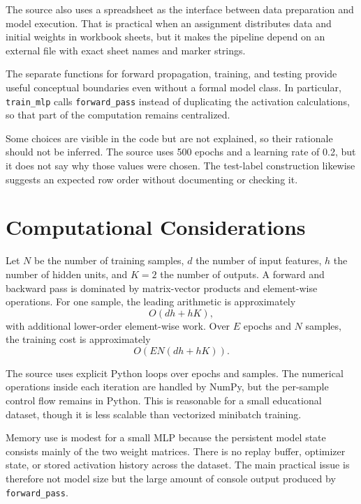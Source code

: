 \documentclass[11pt,a4paper]{article}
\newcommand{\code}[1]{\texttt{\small #1}}
\begin{document}
The source also uses a spreadsheet as the interface between data preparation and model execution. That is practical when an assignment distributes data and initial weights in workbook sheets, but it makes the pipeline depend on an external file with exact sheet names and marker strings.

The separate functions for forward propagation, training, and testing provide useful conceptual boundaries even without a formal model class. In particular, \code{train\_mlp} calls \code{forward\_pass} instead of duplicating the activation calculations, so that part of the computation remains centralized.

Some choices are visible in the code but are not explained, so their rationale should not be inferred. The source uses 500 epochs and a learning rate of 0.2, but it does not say why those values were chosen. The test-label construction likewise suggests an expected row order without documenting or checking it.

\section{Computational Considerations}
Let \(N\) be the number of training samples, \(d\) the number of input features, \(h\) the number of hidden units, and \(K=2\) the number of outputs. A forward and backward pass is dominated by matrix-vector products and element-wise operations. For one sample, the leading arithmetic is approximately
\begin{equation}
O(dh+hK),
\end{equation}
with additional lower-order element-wise work. Over \(E\) epochs and \(N\) samples, the training cost is approximately
\begin{equation}
O\!\left(E N(dh+hK)\right).
\end{equation}

The source uses explicit Python loops over epochs and samples. The numerical operations inside each iteration are handled by NumPy, but the per-sample control flow remains in Python. This is reasonable for a small educational dataset, though it is less scalable than vectorized minibatch training.

Memory use is modest for a small MLP because the persistent model state consists mainly of the two weight matrices. There is no replay buffer, optimizer state, or stored activation history across the dataset. The main practical issue is therefore not model size but the large amount of console output produced by \code{forward\_pass}.
\end{document}
